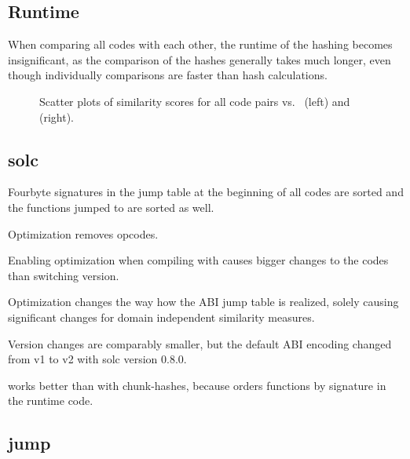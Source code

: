 \documentclass[../main.tex]{subfiles}
\begin{document}
\subsection{Runtime}
\begin{obs}
  When comparing all codes with each other, the runtime of the hashing becomes insignificant, as the comparison of the hashes generally takes much longer, even though individually comparisons are faster than hash calculations.
\end{obs}

\begin{figure}[ht!]
  \centering
  \caption{Scatter plots of  similarity scores for all \n{\solcts} code pairs vs.\  (left) and  (right).}
  \label{fig:ncdLzScat}
\end{figure}

\subsection{solc}
\begin{obs}
  Fourbyte signatures in the jump table at the beginning of all codes are sorted and the functions jumped to are sorted as well.
\end{obs}
\begin{obs}
  Optimization removes  opcodes.
\end{obs}
\begin{obs}
  Enabling optimization when compiling with  causes bigger changes to the codes than switching  version.
\end{obs}
\begin{obs}
  Optimization changes the way how the ABI jump table is realized, solely causing significant changes for domain independent similarity measures.
\end{obs}
\begin{obs}
  Version changes are comparably smaller, but the default ABI encoding changed from v1 to v2 with solc version 0.8.0.
\end{obs}
\begin{res}
   works better than  with chunk-hashes, because  orders functions by signature in the runtime code.
\end{res}

\subsection{jump}
\end{document}

